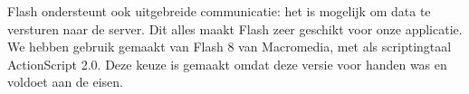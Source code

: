 Flash ondersteunt ook uitgebreide communicatie: het is mogelijk om data te versturen naar de server. Dit alles maakt Flash zeer geschikt voor onze applicatie. We hebben gebruik gemaakt van Flash 8 van Macromedia, met als scriptingtaal ActionScript 2.0. Deze keuze is gemaakt omdat deze versie voor handen was en voldoet aan de eisen.
